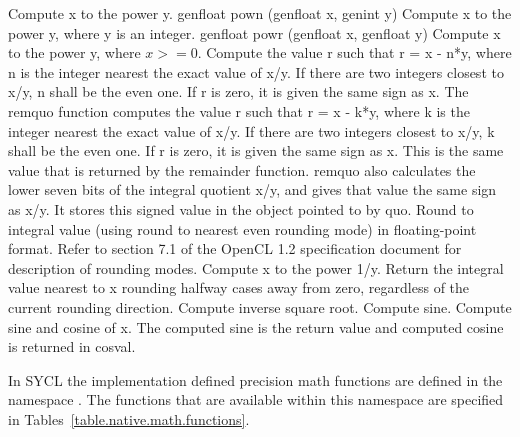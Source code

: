 {
 Compute x to the power y.
}
\addRow
{
genfloat pown (genfloat x, genint y)
}
{
Compute x to the power y, where y is an integer.
}
\addRow
{
genfloat powr (genfloat x, genfloat y)
}
{
Compute x to the power y, where $ x > = 0 $.
}
{
Compute the value r such that r = x - n*y, where n
is the integer nearest the exact value of x/y. If there
are two integers closest to x/y, n shall be the even
one. If r is zero, it is given the same sign as x.
}
{
The remquo function computes the value r such
that r = x - k*y, where k is the integer nearest the
exact value of x/y. If there are two integers closest
to x/y, k shall be the even one. If r is zero, it is
given the same sign as x. This is the same value
that is returned by the remainder function.
remquo also calculates the lower seven bits of the
integral quotient x/y, and gives that value the same
sign as x/y. It stores this signed value in the object
pointed to by quo.
}
{
Round to integral value (using round to nearest
even rounding mode) in floating-point format.
Refer to section 7.1 of the OpenCL 1.2 specification
document\cite{opencl12} for description of rounding
modes.
}
{
Compute x to the power 1/y.
}
{
 Return the integral value nearest to x rounding
halfway cases away from zero, regardless of the
current rounding direction.
}
{
Compute inverse square root.
}
{
 Compute sine.
}
{
Compute sine and cosine of x. The computed sine
is the return value and computed cosine is returned
in cosval.
}
\completeTable

In SYCL the implementation defined precision math functions are
defined in the namespace . The functions
that are available within this namespace are specified in
Tables~\ref{table.native.math.functions}.

